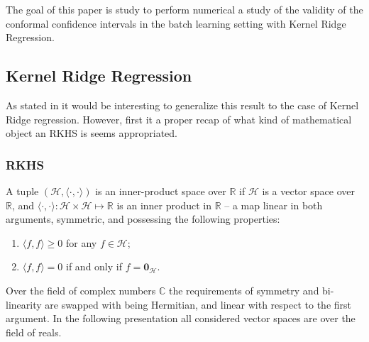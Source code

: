 \documentclass[a4paper,14pt]{extarticle}
\newcommand{\Hcal}{\mathcal{H}}
\newcommand{\Real}{\mathbb{R}}
\newcommand{\nil}{\mathbf{0}}
\newcommand{\Cplx}{\mathbb{C}}
\begin{document}
The goal of this paper is study to perform numerical a study of the validity of
the conformal confidence intervals in the batch learning setting with Kernel Ridge
Regression.



\subsection{Kernel Ridge Regression} %
\label{sub:kernel_ridge_regression}

As stated in \cite{BurVovk2014} it would be interesting to generalize this result
to the case of Kernel Ridge regression. However, first it a proper recap of what 
kind of mathematical object an RKHS is seems appropriated.

\subsubsection{RKHS} %
\label{ssub:rkhs}

A tuple $(\Hcal, \langle\cdot, \cdot\rangle)$ is an inner-product space over $\Real$
if $\Hcal$ is a vector space over $\Real$, and $\langle\cdot, \cdot\rangle : \Hcal
\times \Hcal \mapsto \Real$ is an inner product in $\Real$ -- a map linear in both
arguments, symmetric, and possessing the following properties:
\begin{enumerate}
  \item $\langle f, f\rangle\geq 0$ for any $f\in \Hcal$;
  \item $\langle f, f\rangle = 0$ if and only if $f = \nil_\Hcal$.
\end{enumerate}
Over the field of complex numbers $\Cplx$ the requirements of symmetry and bi-
linearity are swapped with being Hermitian, and linear with respect to the first
argument. In the following presentation all considered vector spaces are over the
field of reals.
\end{document}

